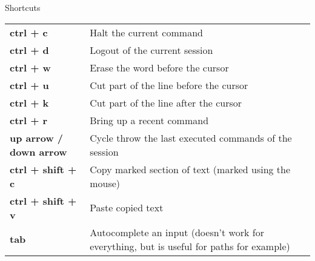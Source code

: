 \begin{block}{Shortcuts}%
	\begin{tabular}{p{\bashcolumnsize}p{\desccolumnsize}}
		\textbf{ctrl + c} & Halt the current command\\
		\textbf{ctrl + d} & Logout of the current session\\
		\textbf{ctrl + w} & Erase the word before the cursor\\
		\textbf{ctrl + u} & Cut part of the line before the cursor\\
		\textbf{ctrl + k} & Cut part of the line after the cursor\\
		\textbf{ctrl + r} & Bring up a recent command\\
		\textbf{up arrow / down arrow} & Cycle throw the last executed commands of the session\\
		\textbf{ctrl + shift + c} & Copy marked section of text (marked using the mouse)\\
		\textbf{ctrl + shift + v} & Paste copied text\\
		\textbf{tab} & Autocomplete an input (doesn't work for everything, but is useful for paths for example)\\
	\end{tabular}
\end{block}
